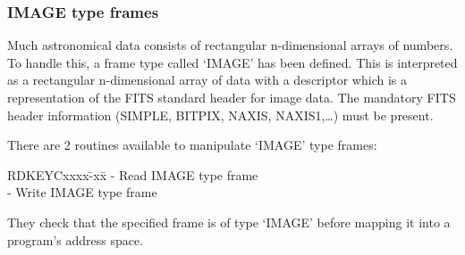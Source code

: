 \subsubsection {IMAGE type frames}
Much astronomical data consists of rectangular n-dimensional arrays of numbers.
To handle this, a frame type called `IMAGE' has been defined.
This is interpreted as a rectangular n-dimensional array of data with a
descriptor which is a representation of the FITS standard header for image data.
The mandatory FITS header information (SIMPLE, BITPIX, NAXIS, NAXIS1,\ldots)
must be present.

There are 2 routines available to manipulate `IMAGE' type frames:
\begin{tabbing}
\hspace{40mm}RDKEYCxxxx\=-xx\=\kill
\hspace{40mm}{\bf RDIMAG} \>- \>Read IMAGE type frame\\
\hspace{40mm}{\bf WRIMAG} \>- \>Write IMAGE type frame
\end{tabbing}
They check that the specified frame is of type `IMAGE' before mapping it into a
program's address space.
